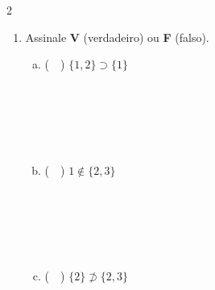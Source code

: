 \documentclass[a4paper,14pt]{article}
\begin{document}
\begin{multicols}{2}
\begin{enumerate}
\begin{enumerate}[a)]
				\item (~~) $\varnothing \subset A$ \\\\\\\\\\\\
				\item (~~) $\{1\} \in A$ \\\\\\\\\\\\
				\item (~~) $\{\{1\}\} \subset A$ \\\\\\\\\\\\
				\item (~~) $A \supset \{2, 3\}$ \\\\\\\\
				\item (~~) $A \supset \{\{1\}, 2\}$ \\\\\\\\\\\\
			\end{enumerate}
			\item Assinale \textbf{V} (verdadeiro) ou \textbf{F} (falso).
			\begin{enumerate}[a)]
				\item (~~) $\{1, 2\} \supset \{1\}$ \\\\\\\\\\\\
				\item (~~) $1 \not\in \{2, 3\}$ \\\\\\\\\\\\
				\item (~~) $\{2\} \not\supset \{2, 3\}$ \\\\\\\\\\\\

\end{enumerate}
\end{enumerate}
\end{multicols}
\end{document}
